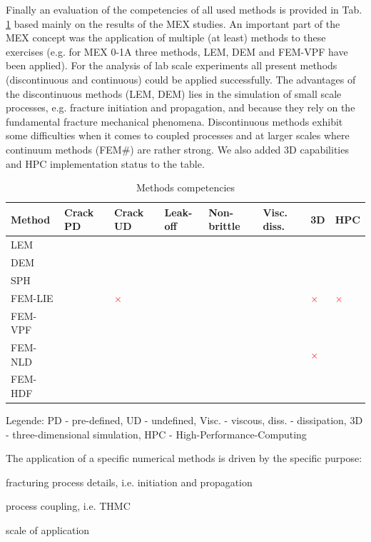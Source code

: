 Finally an evaluation of the competencies of all used methods is provided in Tab. \ref{tab:competencies} based mainly on the results of the MEX studies.
An important part of the MEX concept was the application of multiple (at least) methods to these exercises (e.g. for MEX 0-1A three methods, LEM, DEM and FEM-VPF have been applied). For the analysis of lab scale experiments all present methods (discontinuous and continuous) could be applied successfully. The advantages of the discontinuous methods (LEM, DEM) lies in the simulation of small scale processes, e.g. fracture initiation and propagation, and because they rely on the fundamental fracture mechanical phenomena. Discontinuous methods exhibit some difficulties when it comes to coupled processes and at larger scales where continuum methods (FEM\#) are rather strong. We also added 3D capabilities and HPC implementation status to the table.

\newcommand{\done}{\textcolor{green}{\checkmark}}
\newcommand{\perh}{\textcolor{orange}{\checkmark}}
\newcommand{\none}{\textcolor{red}{$\times$}}
\begin{table}[h!]
\centering
\caption{Methods competencies}
\label{tab:competencies}
\footnotesize
\begin{tabular}{llllllll}
\hline
Method  & Crack PD & Crack UD & Leak-off & Non-brittle & Visc. diss. & 3D & HPC \\
\hline
LEM     & \done & \done & \done & \done & \done & \done & \perh \\
DEM     & \done & \done & \perh & \done & \done & \perh & \done \\
SPH     & \done & \perh & \done & \perh & \done & \done & \done \\
FEM-LIE & \done & \none & \done & \done & \perh & \none & \none \\
FEM-VPF & \done & \done & \done & \done & \perh & \done & \done \\
FEM-NLD & \done & \done & \perh & \done & \perh & \none & \done \\
FEM-HDF &  &  &  &  &  &  & \\
\hline
\end{tabular}
\end{table}
\vspace{-5mm}
\tiny Legende: PD - pre-defined, UD - undefined, Visc. - viscous, diss. - dissipation, 3D - three-dimensional simulation, HPC - High-Performance-Computing 
\normalsize

\bigskip
The application of a specific numerical methods is driven by the specific purpose:
\begin{list}{-}{\leftmargin=1em \itemindent=0em \itemsep=0em}
\item fracturing process details, i.e. initiation and propagation
\item process coupling, i.e. THMC
\item scale of application
\end{list}

